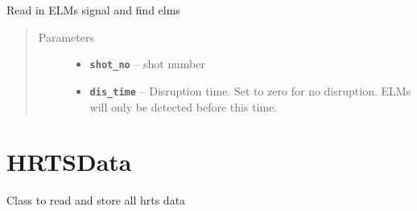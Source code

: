 \documentclass[letterpaper,10pt,english]{sphinxmanual}
\begin{document}
\begin{fulllineitems}
\begin{fulllineitems}
\label{elms_data:elms_data.ElmsData.ELM_WIDTH_MAX}
\end{fulllineitems}


\begin{fulllineitems}
\label{elms_data:elms_data.ElmsData.BE_START_TIME}
\end{fulllineitems}


\begin{fulllineitems}
\label{elms_data:elms_data.ElmsData._find_elms}
Read in ELMs signal and find elms
\begin{quote}\begin{description}
\item[{Parameters}] \leavevmode\begin{itemize}
\item {} 
\textbf{\texttt{shot\_no}} -- shot number

\item {} 
\textbf{\texttt{dis\_time}} -- Disruption time. Set to zero for no disruption. ELMs will only be detected before this time.

\end{itemize}

\end{description}\end{quote}

\end{fulllineitems}


\end{fulllineitems}



\section{HRTSData}
\label{hrts_data:hrtsdata}\label{hrts_data:module-hrts_data}\label{hrts_data::doc}
Class to read and store all hrts data
\end{document}
